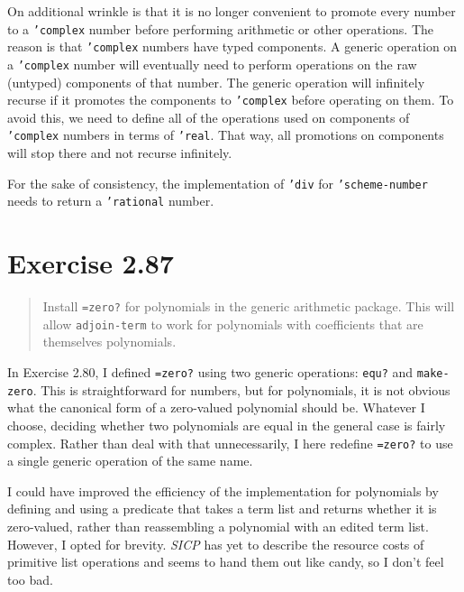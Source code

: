 \documentclass{article}
\begin{document}
On additional wrinkle is that it is no longer convenient to promote every
number to a \texttt{'complex} number before performing arithmetic or other
operations. The reason is that \texttt{'complex} numbers have typed components.
A generic operation on a \texttt{'complex} number will eventually need to
perform operations on the raw (untyped) components of that number. The generic
operation will infinitely recurse if it promotes the components to
\texttt{'complex} before operating on them. To avoid this, we need to define
all of the operations used on components of \texttt{'complex} numbers in terms
of \texttt{'real}. That way, all promotions on components will stop there and
not recurse infinitely.

For the sake of consistency, the implementation of \texttt{'div} for
\texttt{'scheme-number} needs to return a \texttt{'rational} number.




\section{Exercise 2.87}
\begin{quote}
    Install \texttt{=zero?} for polynomials in the generic arithmetic package.
    This will allow \texttt{adjoin-term} to work for polynomials with
    coefficients that are themselves polynomials.
\end{quote}

In Exercise 2.80, I defined \texttt{=zero?} using two generic operations:
\texttt{equ?} and \texttt{make-zero}. This is straightforward for numbers, but
for polynomials, it is not obvious what the canonical form of a zero-valued
polynomial should be. Whatever I choose, deciding whether two polynomials are
equal in the general case is fairly complex. Rather than deal with that
unnecessarily, I here redefine \texttt{=zero?} to use a single generic operation
of the same name.

I could have improved the efficiency of the implementation for polynomials by
defining and using a predicate that takes a term list and returns whether it is
zero-valued, rather than reassembling a polynomial with an edited term list.
However, I opted for brevity. \emph{SICP} has yet to describe the resource costs
of primitive list operations and seems to hand them out like candy, so I don't
feel too bad.


\end{document}
